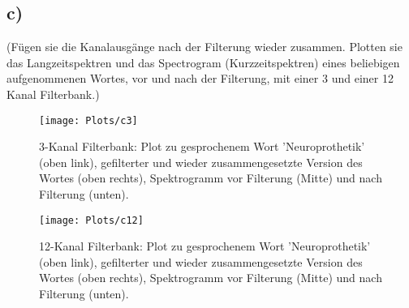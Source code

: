 \documentclass[
a4paper, 
12pt, 
]{article}
\begin{document}
\newpage
\subsection*{c)} (Fügen sie die Kanalausgänge nach der Filterung wieder zusammen. Plotten sie das
Langzeitspektren und das Spectrogram (Kurzzeitspektren) eines beliebigen aufgenommenen
Wortes, vor und nach der Filterung, mit einer 3 und einer 12 Kanal Filterbank.)

\begin{figure}[h]
\centering
\texttt{[image: Plots/c3]}
\caption{3-Kanal Filterbank: Plot zu gesprochenem Wort 'Neuroprothetik' (oben link), gefilterter und wieder zusammengesetzte Version des Wortes (oben rechts), Spektrogramm vor Filterung (Mitte) und nach Filterung (unten).}
\label{fig:c3}
\end{figure}

\begin{figure}[h]
\centering
\texttt{[image: Plots/c12]}
\caption{12-Kanal Filterbank: Plot zu gesprochenem Wort 'Neuroprothetik' (oben link), gefilterter und wieder zusammengesetzte Version des Wortes (oben rechts), Spektrogramm vor Filterung (Mitte) und nach Filterung (unten).}
\label{fig:c12}
\end{figure}


	
	
\end{document}
